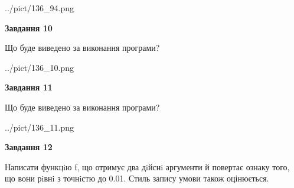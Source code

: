 \documentclass[12pt, ukrainian]{article}
\begin{document}
{\begin {large}
\begin{center}
	{../pict/136_94.png}
\end{center}
\newpage

{\begin {center}\textbf{Завдання 10}\end {center}}

Що буде виведено за виконання програми?\par
\begin{center}
	{../pict/136_10.png}
\end{center}
\newpage

{\begin {center}\textbf{Завдання 11}\end {center}}

Що буде виведено за виконання програми?\par
\begin{center}
	{../pict/136_11.png}
\end{center}
\newpage

{\begin {center}\textbf{Завдання 12}\end {center}}


Написати функцiю f, що отримує два дiйснi аргументи й повертає ознаку того, що вони рiвнi з точнiстю до 0.01. Стиль запису умови також оцінюється.\par
\newpage

\end {large}}
\end{document}
